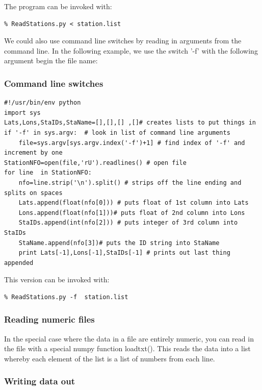 \documentclass[11pt]{book}
\begin{document}
{{\noindent The program can be invoked with:

{\color{blue}\begin{verbatim}
% ReadStations.py < station.list
\end{verbatim}}

We could also use command line switches by reading in arguments from the command line.  In the following example, we use the switch '-f' with the following argument begin the file name:

\subsubsection{Command line switches}

{ \color{blue} \begin{verbatim}
#!/usr/bin/env python
import sys
Lats,Lons,StaIDs,StaName=[],[],[] ,[]# creates lists to put things in
if '-f' in sys.argv:  # look in list of command line arguments
    file=sys.argv[sys.argv.index('-f')+1] # find index of '-f' and increment by one
StationNFO=open(file,'rU').readlines() # open file
for line  in StationNFO:
    nfo=line.strip('\n').split() # strips off the line ending and splits on spaces
    Lats.append(float(nfo[0])) # puts float of 1st column into Lats
    Lons.append(float(nfo[1]))# puts float of 2nd column into Lons
    StaIDs.append(int(nfo[2])) # puts integer of 3rd column into StaIDs
    StaName.append(nfo[3])# puts the ID string into StaName
    print Lats[-1],Lons[-1],StaIDs[-1] # prints out last thing appended
\end{verbatim}}

\noindent This version can be invoked with:

{\color{blue}\begin{verbatim}
% ReadStations.py -f  station.list
\end{verbatim}}

\subsubsection{Reading numeric files}

In the special case where the data in a file are entirely numeric, you can read in the file with a special {\color{blue}numpy} function {\color{blue}loadtxt()}.  This reads the data into a list whereby each element of the list is a list of numbers from each line.

 \subsubsection{Writing data out}

}}
\end{document}
